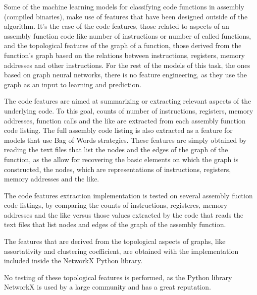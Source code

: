 \begin{appendices}
Some of the machine learning models for classifying code functions in assembly (compiled binaries), make use of features that have been designed outside of the algorithm. It's the case of the code features, those related to aspects of an assembly function code like number of instructions or number of called functions, and the topological features of the graph of a function, those derived from the function's graph based on the relations between instructions, registers, memory addresses and other instructions. 
For the rest of the models of this task, the ones based on graph neural networks, there is no feature engineering, as they use the graph as an input to learning and prediction.

The code features are aimed at summarizing or extracting relevant aspects of the underlying code. To this goal, counts of number of instructions, registers, memory addresses, function calls and the like are extracted from each assembly function code listing. The full assembly code listing is also extracted as a feature for models that use Bag of Words strategies. These features are simply obtained by reading the text files that list the nodes and the edges of the graph of the function, as the allow for recovering the basic elements on which the graph is constructed, the nodes, which are representations of instructions, registers, memory addresses and the like.


The code features extraction implementation is tested on several assembly fuction code listings, by comparing the counts of instructions, registeres, memory addresses and the like versus those values extracted by the code that reads the text files that list nodes and edges of the graph of the assembly function.


The features that are derived from the topological aspects of graphs, like assortativity and clustering coefficient, are obtained with the implementation included inside the NetworkX Python library.

No testing of these topological features is performed, as the Python library NetworkX is used by a large community and has a great reputation. 



\end{appendices} 